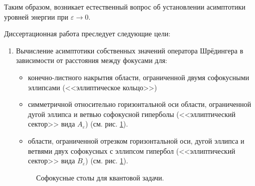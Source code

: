Таким образом, возникает естественный вопрос об установлении асимптотики уровней энергии при $\varepsilon\to 0$. 

{\aim} 
Диссертационная работа преследует следующие цели:
\begin{enumerate}[beginpenalty=10000] %
  \item Вычисление асимптотики собственных значений оператора Шрёдингера в зависимости от расстояния между фокусами для:
  \begin{itemize}[beginpenalty=10000] %
  \item конечно-листного накрытия области, ограниченной двумя софокусными эллипсами (<<эллиптическое кольцо>>)
  \item симметричной относительно горизонтальной оси области, ограниченной дугой эллипса и ветвью софокусной  гиперболы (<<эллиптический сектор>> вида $A_\varepsilon$)  (см. рис. \ref{fig:intro_quantum_domains}).
  \item области, ограниченной отрезком горизонтальной оси, дугой эллипса и ветвями двух софокусных с эллипсом гипербол (<<эллиптический сектор>> вида $B_\varepsilon$)  (см. рис. \ref{fig:intro_quantum_domains}).
  \end{itemize}
   \begin{figure}[ht]
    \caption{Софокусные столы для квантовой задачи.}\label{fig:intro_quantum_domains}
\end{figure}
  

\end{enumerate}
